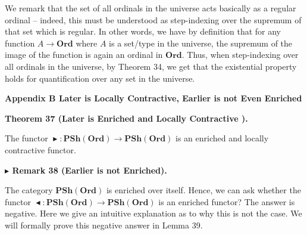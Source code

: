  
 
We remark that the set of all ordinals in the universe acts basically as a regular ordinal – indeed, this must be understood as step-indexing over the supremum of that set which is regular. In other words, we have by definition that for any function $A\to\mathbf{Ord}$ where $A$ is a set/type in the universe, the supremum of the image of the function is again an ordinal in $\mathbf{Ord}$. Thus, when step-indexing over all ordinals in the universe, by Theorem 34, we get that the existential property holds for quantification over any set in the universe.\par
 
 
 
 


 
\par\medskip\noindent\textbf{Appendix B Later is Locally Contractive, Earlier is not Even Enriched}\par
 
 
\par\medskip\noindent\textbf{Theorem 37 (Later is Enriched and Locally Contractive ).}\par
 
 
The functor $\mathop{\blacktriangleright}:\mathbf{PSh}(\mathbf{Ord})\to\mathbf{PSh}(\mathbf{Ord})$ is an enriched and locally contractive functor.\par
 
 
 
 
\par\medskip\noindent\textbf{$\blacktriangleright$ Remark 38 (Earlier is not Enriched).}\par
 
 
The category $\mathbf{PSh}(\mathbf{Ord})$ is enriched over itself. Hence, we can ask whether the functor $\mathop{\blacktriangleleft}:\mathbf{PSh}(\mathbf{Ord})\to\mathbf{PSh}(\mathbf{Ord})$ is an enriched functor? The answer is negative. Here we give an intuitive explanation as to why this is not the case. We will formally prove this negative answer in Lemma 39.\par
 
